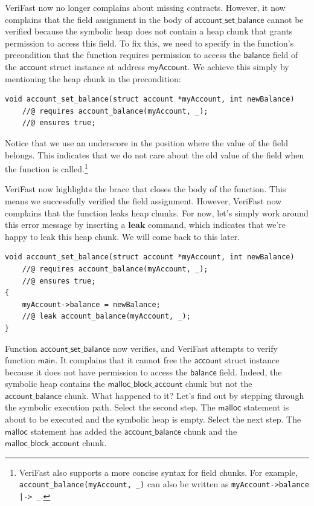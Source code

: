\documentclass{article}
\begin{document}
VeriFast now no longer complains about missing contracts.
However, it now complains that the field assignment in the body
of $\mathsf{account\_set\_balance}$ cannot be verified because
the symbolic heap does not contain a heap chunk that grants
permission to access this field. To fix this, we need to
specify in the function's precondition that the function
requires permission to access the $\mathsf{balance}$ field of
the $\mathsf{account}$ struct instance at address
$\mathsf{myAccount}$. We achieve this simply by mentioning the
heap chunk in the precondition:
\begin{lstlisting}
void account_set_balance(struct account *myAccount, int newBalance)
    //@ requires account_balance(myAccount, _);
    //@ ensures true;
\end{lstlisting}
Notice that we use an underscore in the position where the
value of the field belongs. This indicates that we do not care
about the old value of the field when the function is
called.\footnote{VeriFast also supports a more concise syntax
for field chunks. For example,
\lstinline!account_balance(myAccount, _)! can also be written as
\lstinline!myAccount->balance |-> _!.}

VeriFast now highlights the brace that closes the body of the
function. This means we successfully verified the field
assignment. However, VeriFast now complains that the function
leaks heap chunks. For now, let's simply work around this error
message by inserting a $\mathbf{leak}$ command, which indicates
that we're happy to leak this heap chunk. We will come back to
this later.
\begin{lstlisting}
void account_set_balance(struct account *myAccount, int newBalance)
    //@ requires account_balance(myAccount, _);
    //@ ensures true;
{
    myAccount->balance = newBalance;
    //@ leak account_balance(myAccount, _);
}
\end{lstlisting}

Function $\mathsf{account\_set\_balance}$ now verifies, and
VeriFast attempts to verify function $\mathsf{main}$. It
complains that it cannot free the $\mathsf{account}$ struct
instance because it does not have permission to access the
$\mathsf{balance}$ field. Indeed, the symbolic heap contains
the $\mathsf{malloc\_block\_account}$ chunk but not the
$\mathsf{account\_balance}$ chunk. What happened to it? Let's
find out by stepping through the symbolic execution path.
Select the second step. The $\mathsf{malloc}$ statement is about
to be executed and the symbolic heap is empty. Select the next
step. The $\mathsf{malloc}$ statement has added the
$\mathsf{account\_balance}$ chunk and the
$\mathsf{malloc\_block\_account}$ chunk.
\end{document}
